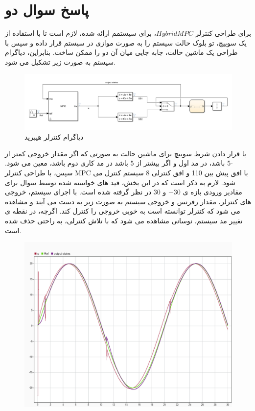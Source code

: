 \section{پاسخ سوال دو}
برای طراحی کنترلر $Hybrid MPC$، برای سیستمم ارائه شده، لازم است تا با استفاده از یک سوییچ، تو بلوک حالت سیستم را به صورت موازی در سیستم قرار داده و سپس با طراحی یک ماشین حالت، جابه جایی میان آن دو را ممکن ساخت. بنابراین، دیاگرام سیستم به صورت زیر تشکیل می شود.
\begin{figure}
	\centering
	\includegraphics[width=0.7\linewidth]{../img/47}
	\caption{دیاگرام کنترلر هیبرید}
	\label{fig:47}
\end{figure}
با قرار دادن شرط سوییچ برای ماشین حالت به صورتی که اگر مقدار خروجی کمتر از -5 باشد، در مد اول و اگر بیشتر از 5 باشد در مد کاری دوم باشد، معین می شود.
سپس، با طراحی کنترلر MPC با افق پیش بین 110 و افق کنترلی 8 سیستم کنترل می شود. لازم به ذکر است که در این بخش، قید های خواسته شده توسط سوال برای مقادیر ورودی بازه ی $-30$ و $30$ در نظر گرفته شده است. 
با اجرای سیستم، خروجی های کنترلر، مقدار رفرنس و خروجی سیستم به صورت زیر به دست می آیند و مشاهده می شود که کنترلر توانسته است به خوبی خروجی را کنترل کند. اگرچه، در نقطه ی تغییر مد سیستم، نوسانی مشاهده می شود که با تلاش کنترلی، به راحتی حذف شده است.
\begin{figure}
	\centering
	\includegraphics[width=0.7\linewidth]{../img/46}
	\caption{}
	\label{fig:46}
\end{figure}























